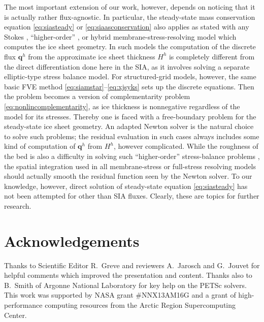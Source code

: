 \documentclass[twocolumn,letterpaper]{igs}
\newcommand\bq{\mathbf{q}}
\begin{document}
The most important extension of our work, however, depends on noticing that it is actually rather flux-agnostic.  In particular, the steady-state mass conservation equation \eqref{eq:siasteady} or \eqref{eq:siaasconservation} also applies as stated with any Stokes \citep{GreveBlatter2009}, ``higher-order'' \citep{Pattynetal2008}, or hybrid membrane-stress-resolving \citep{Winkelmannetal2011} model which computes the ice sheet geometry.  In such models the computation of the discrete flux $\bq^h$ from the approximate ice sheet thickness $H^h$ is completely different from the direct differentiation done here in the SIA, as it involves solving a separate elliptic-type stress balance model.  For structured-grid models, however, the same basic FVE method \eqref{eq:siamstar}--\eqref{eq:xjsyks} sets up the discrete equations.  Then the problem becomes a version of complementarity problem \eqref{eq:nonlincomplementarity}, as ice thickness is nonnegative regardless of the model for its stresses.  Thereby one is faced with a free-boundary problem for the steady-state ice sheet geometry.  An adapted Newton solver is the natural choice to solve such problems; the residual evaluation in such cases always includes some kind of computation of $\bq^h$ from $H^h$, however complicated.  While the roughness of the bed is also a difficulty in solving such ``higher-order'' stress-balance problems \citep{BrownSmithAhmadia2013}, the spatial integration used in all membrane-stress or full-stress resolving models should actually smooth the residual function seen by the Newton solver.  To our knowledge, however, direct solution of steady-state equation \eqref{eq:siasteady} has not been attempted for other than SIA fluxes.  Clearly, these are topics for further research.


\section*{Acknowledgements}
Thanks to Scientific Editor R.~Greve and reviewers A.~Jarosch and G.~Jouvet for helpful comments which improved the presentation and content.  Thanks also to B.~Smith of Argonne National Laboratory for key help on the PETSc solvers.  This work was supported by NASA grant \#NNX13AM16G and a grant of high-performance computing resources from the Arctic Region Supercomputing Center.



%
%
\end{document}
